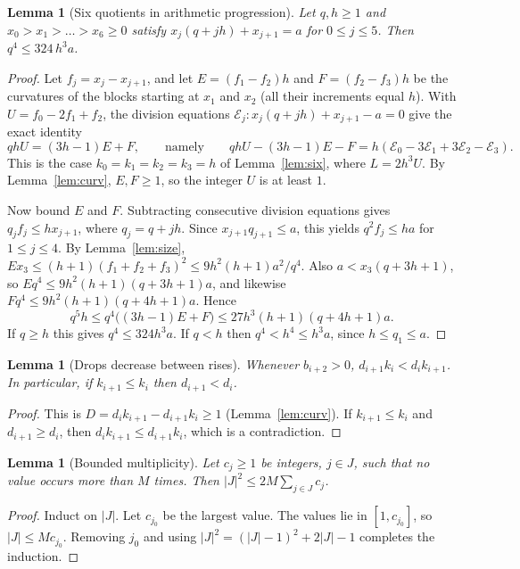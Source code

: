 \documentclass[11pt]{article}
\newtheorem{lemma}[theorem]{Lemma}
\theoremstyle{definition}
\theoremstyle{remark}
\begin{document}
\begin{lemma}[Six quotients in arithmetic progression]\label{lem:ap}
Let $q,h\ge1$ and $x_0>x_1>\dots>x_6\ge0$ satisfy $x_j(q+jh)+x_{j+1}=a$ for $0\le j\le5$. Then
$q^4\le 324\,h^3a$.
\end{lemma}

\begin{proof}
Let $f_j=x_j-x_{j+1}$, and let $E=(f_1-f_2)h$ and $F=(f_2-f_3)h$ be the curvatures of the blocks
starting at $x_1$ and $x_2$ (all their increments equal $h$). With $U=f_0-2f_1+f_2$, the
division equations $\mathcal E_j\colon x_j(q+jh)+x_{j+1}-a=0$ give the exact identity
\[
qhU=(3h-1)E+F,\qquad\text{namely}\qquad qhU-(3h-1)E-F=h(\mathcal E_0-3\mathcal E_1+3\mathcal E_2-\mathcal E_3).
\]
This is the case $k_0=k_1=k_2=k_3=h$ of Lemma~\ref{lem:six}, where $L=2h^3U$. By
Lemma~\ref{lem:curv}, $E,F\ge1$, so the integer $U$ is at least $1$.

Now bound $E$ and $F$. Subtracting consecutive division equations gives
$q_jf_j\le hx_{j+1}$, where $q_j=q+jh$. Since $x_{j+1}q_{j+1}\le a$, this yields
$q^2f_j\le ha$ for $1\le j\le4$. By Lemma~\ref{lem:size},
$Ex_3\le(h+1)(f_1+f_2+f_3)^2\le 9h^2(h+1)a^2/q^4$. Also $a<x_3(q+3h+1)$, so
$Eq^4\le 9h^2(h+1)(q+3h+1)a$, and likewise $Fq^4\le 9h^2(h+1)(q+4h+1)a$. Hence
\[
q^5h\le q^4\bigl((3h-1)E+F\bigr)\le 27h^3(h+1)(q+4h+1)a .
\]
If $q\ge h$ this gives $q^4\le 324h^3a$. If $q<h$ then $q^4<h^4\le h^3a$, since $h\le q_1\le a$.
\end{proof}

\begin{lemma}[Drops decrease between rises]\label{lem:norise}
Whenever $b_{i+2}>0$, $d_{i+1}k_i<d_ik_{i+1}$. In particular, if $k_{i+1}\le k_i$ then
$d_{i+1}<d_i$.
\end{lemma}

\begin{proof}
This is $D=d_ik_{i+1}-d_{i+1}k_i\ge1$ (Lemma~\ref{lem:curv}). If $k_{i+1}\le k_i$ and
$d_{i+1}\ge d_i$, then $d_ik_{i+1}\le d_{i+1}k_i$, which is a contradiction.
\end{proof}

\begin{lemma}[Bounded multiplicity]\label{lem:mult}
Let $c_j\ge1$ be integers, $j\in J$, such that no value occurs more than $M$ times. Then
$|J|^2\le 2M\sum_{j\in J}c_j$.
\end{lemma}

\begin{proof}
Induct on $|J|$. Let $c_{j_0}$ be the largest value. The values lie in $[1,c_{j_0}]$, so
$|J|\le Mc_{j_0}$. Removing $j_0$ and using $|J|^2=(|J|-1)^2+2|J|-1$ completes the induction.
\end{proof}
\end{document}
